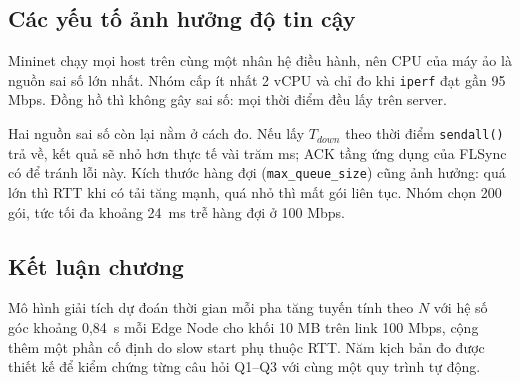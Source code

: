 \subsection{Các yếu tố ảnh hưởng độ tin cậy}
Mininet chạy mọi host trên cùng một nhân hệ điều hành, nên CPU của máy ảo là nguồn sai số lớn nhất. Nhóm cấp ít nhất 2 vCPU và chỉ đo khi \texttt{iperf} đạt gần 95 Mbps. Đồng hồ thì không gây sai số: mọi thời điểm đều lấy trên server.

Hai nguồn sai số còn lại nằm ở cách đo. Nếu lấy $T_{down}$ theo thời điểm \texttt{sendall()} trả về, kết quả sẽ nhỏ hơn thực tế vài trăm ms; ACK tầng ứng dụng của FLSync có để tránh lỗi này. Kích thước hàng đợi (\nolinkurl{max_queue_size}) cũng ảnh hưởng: quá lớn thì RTT khi có tải tăng mạnh, quá nhỏ thì mất gói liên tục. Nhóm chọn 200 gói, tức tối đa khoảng 24~ms trễ hàng đợi ở 100 Mbps.

\subsection{Kết luận chương}
Mô hình giải tích dự đoán thời gian mỗi pha tăng tuyến tính theo $N$ với hệ số góc khoảng 0{,}84~s mỗi Edge Node cho khối 10 MB trên link 100 Mbps, cộng thêm một phần cố định do slow start phụ thuộc RTT. Năm kịch bản đo được thiết kế để kiểm chứng từng câu hỏi Q1--Q3 với cùng một quy trình tự động.

\cleardoublepage

